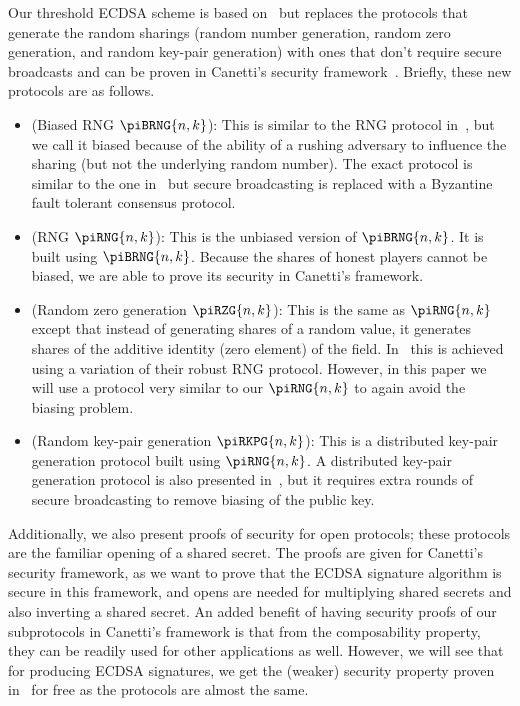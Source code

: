 \documentclass{article}
\newcommand\paper{paper}
\theoremstyle{remark}
\begin{document}
Our threshold ECDSA scheme is based on~\cite{gjkr96} but replaces the protocols
that generate the random sharings (random number generation, random zero
generation, and random key-pair generation) with ones that don't require secure
broadcasts and can be proven in Canetti's security framework~\cite{c00}.
Briefly, these new protocols are as follows.
\begin{itemize}
	\item (Biased RNG $\piBRNG{n,k}$): This is similar to the RNG protocol
		in~\cite{p91a}, but we call it biased because of the ability of a
		rushing adversary to influence the sharing (but not the underlying
		random number). The exact protocol is similar to the one
		in~\cite{gjkr96} but secure broadcasting is replaced with a Byzantine
		fault tolerant consensus protocol.
	\item (RNG $\piRNG{n,k}$): This is the unbiased version of $\piBRNG{n,k}$.
		It is built using $\piBRNG{n,k}$. Because the shares of honest players
		cannot be biased, we are able to prove its security in Canetti’s
		framework.
	\item (Random zero generation $\piRZG{n,k}$): This is the same as
		$\piRNG{n,k}$ except that instead of generating shares of a random
		value, it generates shares of the additive identity (zero element) of
		the field. In~\cite{gjkr96} this is achieved using a variation of their
		robust RNG protocol. However, in this \paper{} we will use a protocol
		very similar to our $\piRNG{n,k}$ to again avoid the biasing problem.
	\item (Random key-pair generation $\piRKPG{n,k}$): This is a distributed
		key-pair generation protocol built using $\piRNG{n,k}$. A distributed
		key-pair generation protocol is also presented in~\cite{gjkr07}, but it
		requires extra rounds of secure broadcasting to remove biasing of the
		public key.
\end{itemize}

Additionally, we also present proofs of security for open protocols; these
protocols are the familiar opening of a shared secret. The proofs are given for
Canetti's security framework, as we want to prove that the ECDSA signature
algorithm is secure in this framework, and opens are needed for multiplying
shared secrets and also inverting a shared secret. An added benefit of having
security proofs of our subprotocols in Canetti's framework is that from the
composability property, they can be readily used for other applications as
well. However, we will see that for producing ECDSA signatures, we get the
(weaker) security property proven in~\cite{gjkr96} for free as the protocols
are almost the same.
\end{document}
